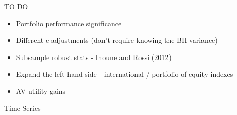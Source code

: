 \documentclass{beamer}
\begin{document}
\begin{frame}{TO DO}
	\begin{itemize}
			\item Portfolio performance significance
			\item Different c adjustments (don't require knowing the BH variance)
			\item Subsample robust stats - Inoune and Rossi (2012)
			\item Expand the left hand side - international / portfolio of equity indexes
			\item AV utility gains
	\end{itemize}

\end{frame}

\begin{frame}{Time Series}
	\begin{adjustbox}{width=\textwidth}
			
	\end{adjustbox}
\end{frame}
\end{document}
